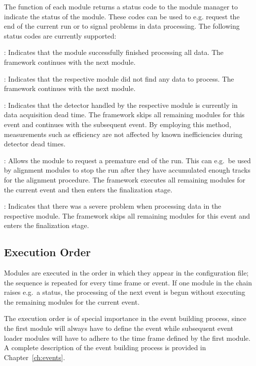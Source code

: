 The  function of each module returns a status code to the module manager to indicate the status of the module.
These codes can be used to e.g. request the end of the current run or to signal problems in data processing.
The following status codes are currently supported:

\begin{description}
    \item{}: Indicates that the module successfully finished processing all data. The framework continues with the next module.
    \item{}: Indicates that the respective module did not find any data to process. The framework continues with the next module.
    \item{}: Indicates that the detector handled by the respective module is currently in data acquisition dead time. The framework skips all remaining modules for this event and continues with the subsequent event. By employing this method, measurements such as efficiency are not affected by known inefficiencies during detector dead times.
    \item{}: Allows the module to request a premature end of the run. This can e.g.\ be used by alignment modules to stop the run after they have accumulated enough tracks for the alignment procedure. The framework executes all remaining modules for the current event and then enters the finalization stage.
    \item{}: Indicates that there was a severe problem when processing data in the respective module. The framework skips all remaining modules for this event and enters the finalization stage.
\end{description}

\subsection{Execution Order}

Modules are executed in the order in which they appear in the configuration file; the sequence is repeated for every time frame or event.
If one module in the chain raises e.g.\ a  status, the processing of the next event is begun without executing the remaining modules for the current event.

The execution order is of special importance in the event building process, since the first module will always have to define the event while subsequent event loader modules will have to adhere to the time frame defined by the first module.
A complete description of the event building process is provided in Chapter~\ref{ch:events}.

